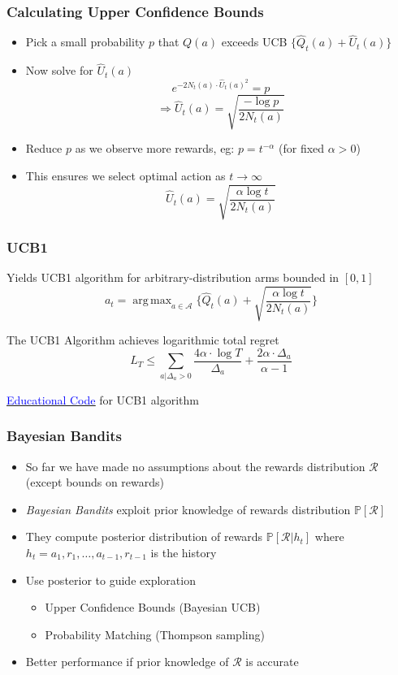 \documentclass[handout]{beamer}
\DeclareMathOperator*{\argmax}{arg\,max}
\begin{document}
\begin{frame}
\frametitle{Calculating Upper Confidence Bounds}
\pause
\begin{itemize}[<+->]
\item Pick a small probability $p$ that $Q(a)$ exceeds UCB $\{\hat{Q}_t(a) + \hat{U}_t(a)\}$
\item Now solve for $\hat{U}_t(a)$
$$e^{-2N_t(a) \cdot \hat{U}_t(a)^2} = p$$
$$\Rightarrow \hat{U}_t(a) = \sqrt{\frac {-\log p} {2 N_t(a)}}$$
\item Reduce $p$ as we observe more rewards, eg: $p = t^{-\alpha}$ (for fixed $\alpha > 0$)
\item This ensures we select optimal action as $t\rightarrow \infty$
$$\hat{U}_t(a) = \sqrt{\frac {\alpha \log t} {2N_t(a)}}$$
\end{itemize}
\end{frame}

\begin{frame}
\frametitle{UCB1}
\pause
Yields UCB1 algorithm for arbitrary-distribution arms bounded in $[0,1]$
$$a_t = \argmax_{a\in \mathcal{A}} \{ \hat{Q}_t(a) + \sqrt{\frac {\alpha \log t} {2N_t(a)}} \}$$
\begin{theorem}
The UCB1 Algorithm achieves logarithmic total regret
$$L_T \leq \sum_{a|\Delta_a > 0} \frac {4\alpha \cdot \log T} {\Delta_a} + \frac {2\alpha \cdot \Delta_a}{\alpha - 1}$$
\end{theorem}
\href{https://github.com/TikhonJelvis/RL-book/tree/master/rl/chapter14/ucb1.py}{\underline{\textcolor{blue}{Educational Code}}} for UCB1 algorithm
\end{frame}

\begin{frame}
\frametitle{Bayesian Bandits}
\pause
\begin{itemize}
\item So far we have made no assumptions about the rewards distribution $\mathcal{R}$ (except bounds on rewards)
\item {\em Bayesian Bandits} exploit prior knowledge of rewards distribution $\mathbb{P}[\mathcal{R}]$
\item They compute posterior distribution of rewards $\mathbb{P}[\mathcal{R}|h_t]$ where $h_t = a_1,r_1, \ldots, a_{t-1}, r_{t-1}$ is the history
\item Use posterior to guide exploration
\begin{itemize}
\item Upper Confidence Bounds (Bayesian UCB)
\item Probability Matching (Thompson sampling)
\end{itemize}
\item Better performance if prior knowledge of $\mathcal{R}$ is accurate
\end{itemize}
\end{frame}
\end{document}
